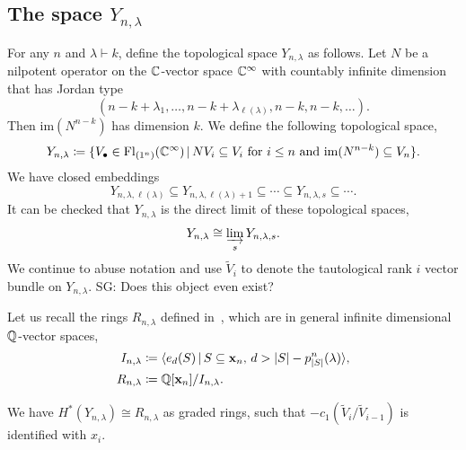 \documentclass[12pt]{amsart}
\newcommand{\st}{\,|\,}
\newcommand{\Fl}{\mathrm{Fl}}
\newcommand{\la}{\lambda}
\newcommand{\im}{\mathrm{im}}
\newcommand{\Hom}{\mathrm{Hom}}
\newcommand{\bx}{\mathbf{x}}
\newcommand{\SG}[1]{{\color{red} SG: #1}}
\begin{document}
\subsection{The space $Y_{n,\lambda}$}
For any $n$ and $\lambda\vdash k$, define the topological space $Y_{n,\la}$ as follows. Let $N$ be a nilpotent operator on the $\mathbb{C}$-vector space $\mathbb{C}^\infty$ with countably infinite dimension that has Jordan type \[(n-k+\la_1, \dots, n-k+\la_{\ell(\la)}, n-k,n-k,\dots).\] 
Then $\im(N^{n-k})$ has dimension $k$. We define the following topological space,
\begin{align}
    Y_{n,\la}\coloneqq \{V_\bullet\in \Fl_{(1^n)}(\bC^\infty)\st NV_i\subseteq V_i \text{ for }i\leq n\text{ and }\im(N^{n-k})\subseteq V_n\}.
\end{align}
We have closed embeddings
\[
Y_{n,\la,\ell(\la)}\subseteq Y_{n,\la,\ell(\la)+1}\subseteq\cdots\subseteq Y_{n,\la,s}\subseteq\cdots.
\]
It can be checked that $Y_{n,\la}$ is the direct limit of these topological spaces,
\[Y_{n,\la} \cong \varinjlim_s Y_{n,\la,s}.\]
We continue to abuse notation and use $\widetilde V_i$ to denote the tautological rank $i$ vector bundle on $Y_{n,\la}$. \SG{Does this object even exist?}


Let us recall the rings $R_{n,\la}$ defined in~\cite{GriffinOSP}, which are in general infinite dimensional $\mathbb{Q}$-vector spaces,
\begin{align}
I_{n,\la} &\coloneqq \langle e_d(S) \st S\subseteq \bx_n,\, d>|S| - p_{|S|}^n(\la)\rangle,\\
R_{n,\la} &\coloneqq \bQ[\bx_n]/I_{n,\la}.
\end{align}



\begin{theorem}\label{thm:InfiniteIso}
We have $H^*(Y_{n,\la})\cong R_{n,\la}$ as graded rings, such that $-c_1(\widetilde V_i/\widetilde V_{i-1})$ is identified with $x_i$.
\end{theorem}
\end{document}
